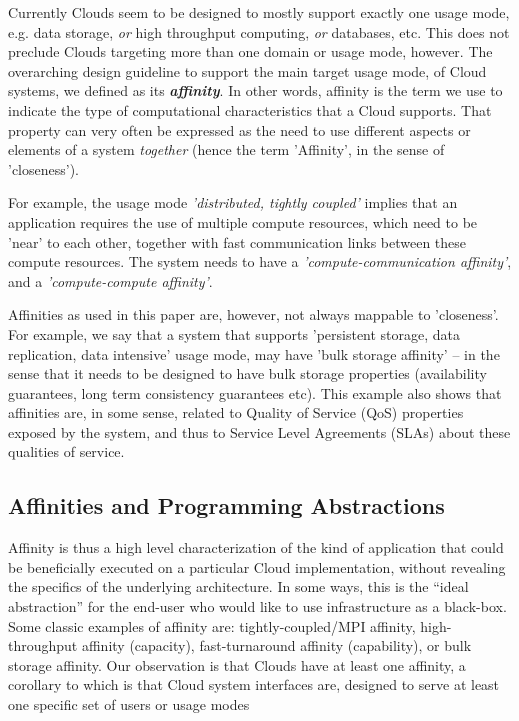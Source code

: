 \documentclass{article}
\newcommand{\I}[1]{\textit{#1}}
\newcommand{\BI}[1]{\textbf{\textit{#1}}}
\begin{document}
  Currently Clouds seem to be designed to mostly support exactly one
  usage mode, e.g.  data storage, \I{or} high throughput computing,
  \I{or} databases, etc.  This does not preclude Clouds targeting more
  than one domain or usage mode, however.  The overarching design
  guideline to support the main target usage mode, of Cloud systems,
  we defined as its \BI{affinity}.  In other words, affinity is the
  term we use to indicate the type of computational characteristics
  that a Cloud supports.  That property can very often be expressed as
  the need to use different aspects or elements of a system
  \I{together} (hence the term 'Affinity', in the sense of
  'closeness').  

  For example, the usage mode \I{'distributed, tightly coupled'}
  implies that an application requires the use of multiple compute
  resources, which need to be 'near' to each other, together with fast
  communication links between these compute resources.  The system
  needs to have a \I{'compute-communication affinity'}, and a
  \I{'compute-compute affinity'}.

  Affinities as used in this paper are, however, not always mappable
  to 'closeness'.  For example, we say that a system that supports
  'persistent storage, data replication, data intensive' usage mode,
  may have 'bulk storage affinity' -- in the sense that it needs to be
  designed to have bulk storage properties (availability guarantees,
  long term consistency guarantees etc).  This example also shows that
  affinities are, in some sense, related to Quality of Service (QoS)
  properties exposed by the system, and thus to Service Level
  Agreements (SLAs) about these qualities of service.


 \subsection{Affinities and Programming Abstractions}

  Affinity is thus a high level characterization of the kind of
  application that could be beneficially executed on a particular
  Cloud implementation, without revealing the specifics of the
  underlying architecture. In some ways, this is the ``ideal
  abstraction'' for the end-user who would like to use infrastructure
  as a black-box.  Some classic examples of affinity are:
  tightly-coupled/MPI affinity, high-throughput affinity (capacity),
  fast-turnaround affinity (capability), or bulk storage affinity.
  Our observation is that Clouds have at least one affinity, a
  corollary to which is that Cloud system interfaces are, designed to
  serve at least one specific set of users or usage modes
\end{document}
